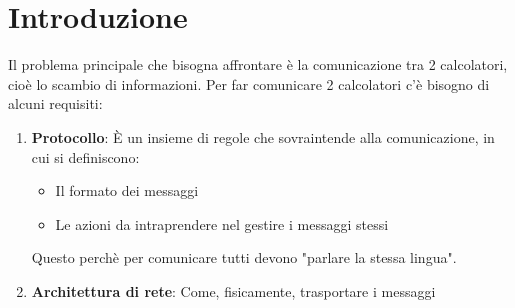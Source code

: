 \documentclass[a4paper]{article}
\theoremstyle{break}
\theoremstyle{break}
\theoremstyle{break}
\theoremstyle{break}
\begin{document}


\tableofcontents
\pagebreak

\section{Introduzione}
Il problema principale che bisogna affrontare è la comunicazione tra 2 calcolatori,
cioè lo scambio di informazioni. Per far comunicare 2 calcolatori c'è bisogno di
alcuni requisiti:
\begin{enumerate}
  \item \textbf{Protocollo}: È un insieme di regole che sovraintende alla comunicazione,
    in cui si definiscono:
    \begin{itemize}
      \item Il formato dei messaggi
      \item Le azioni da intraprendere nel gestire i messaggi stessi
    \end{itemize}
    Questo perchè per comunicare tutti devono "parlare la stessa lingua".

  \item \textbf{Architettura di rete}: Come, fisicamente, trasportare i messaggi
\end{enumerate}
\end{document}
